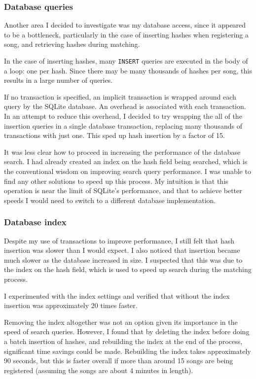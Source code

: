 \documentclass[12pt,a4paper,twoside,openright]{report}
\begin{document}
\subsubsection{Database queries}

Another area I decided to investigate was my database access, since it appeared to be a bottleneck, particularly in the case of inserting hashes when registering a song, and retrieving hashes during matching.

In the case of inserting hashes, many \lstinline{INSERT} queries are executed in the body of a loop: one per hash. Since there may be many thousands of hashes per song, this results in a large number of queries.

If no transaction is specified, an implicit transaction is wrapped around each query by the SQLite database. An overhead is associated with each transaction. In an attempt to reduce this overhead, I decided to try wrapping the all of the insertion queries in a single database transaction, replacing many thousands of transactions with just one. This sped up hash insertion by a factor of 15.

It was less clear how to proceed in increasing the performance of the database search. I had already created an index on the hash field being searched, which is the conventional wisdom on improving search query performance. I was unable to find any other solutions to speed up this process. My intuition is that this operation is near the limit of SQLite's performance, and that to achieve better speeds I would need to switch to a different database implementation.

\subsubsection{Database index}

Despite my use of transactions to improve performance, I still felt that hash insertion was slower than I would expect. I also noticed that insertion became much slower as the database increased in size. I suspected that this was due to the index on the hash field, which is used to speed up search during the matching process.

I experimented with the index settings and verified that without the index insertion was approximately 20 times faster.

Removing the index altogether was not an option given its importance in the speed of search queries. However, I found that by deleting the index before doing a batch insertion of hashes, and rebuilding the index at the end of the process, significant time savings could be made. Rebuilding the index takes approximately 90 seconds, but this is faster overall if more than around 15 songs are being registered (assuming the songs are about 4 minutes in length).
\end{document}

